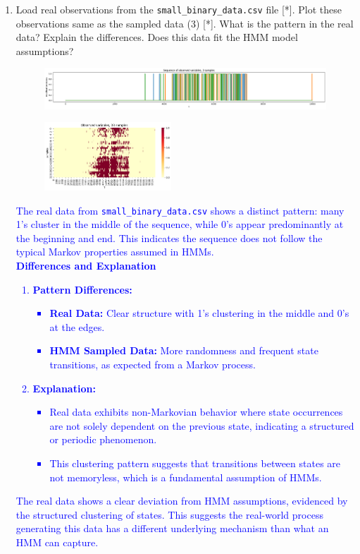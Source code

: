 \documentclass[a4 paper]{article}
\begin{document}
\begin{enumerate}
    \item Load real observations from the \texttt{small\_binary\_data.csv} file [*]. Plot these observations same as the sampled data (3) [*]. 
    What is the pattern in the real data? Explain the differences. Does this data fit the HMM model assumptions?
    \begin{figure}[H]
        \centering
        \includegraphics[width=\textwidth]{../plots/Q2_real_data_sequence_observed.png}
    \end{figure}
    \begin{figure}[H]
        \centering
        \includegraphics[width=0.45\textwidth]{../plots/Q2_real_data_heatmap_observed.png}
    \end{figure}  
    \textcolor{blue}{
        The real data from \texttt{small\_binary\_data.csv} shows a distinct pattern: many 1’s cluster in the middle of the sequence, while 0’s appear predominantly at the beginning and end. 
        This indicates the sequence does not follow the typical Markov properties assumed in HMMs. \\
        \textbf{Differences and Explanation}
        \begin{enumerate}
            \item \textbf{Pattern Differences:}
            \begin{itemize}
                \item \textbf{Real Data:} Clear structure with 1’s clustering in the middle and 0’s at the edges.
                \item \textbf{HMM Sampled Data:} More randomness and frequent state transitions, as expected from a Markov process.
            \end{itemize}
            \item \textbf{Explanation:}
            \begin{itemize}
                \item Real data exhibits non-Markovian behavior where state occurrences are not solely dependent on the previous state, indicating a structured or periodic phenomenon.
                \item This clustering pattern suggests that transitions between states are not memoryless, which is a fundamental assumption of HMMs.
            \end{itemize}
        \end{enumerate}
        The real data shows a clear deviation from HMM assumptions, evidenced by the structured clustering of states. 
        This suggests the real-world process generating this data has a different underlying mechanism than what an HMM can capture.
    }


\end{enumerate}
\end{document}
